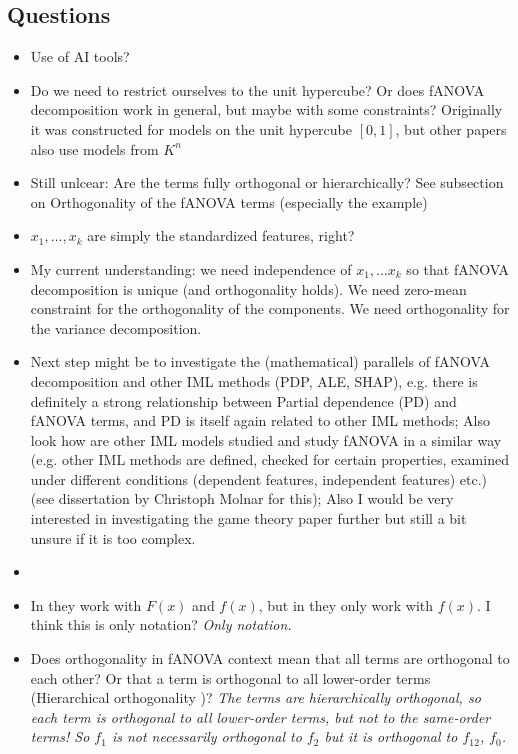 \subsection*{Questions}


\begin{itemize}
    \item Use of AI tools?
    \item Do we need to restrict ourselves to the unit hypercube? Or does fANOVA decomposition work in general, but maybe with some constraints? Originally it was constructed for models on the unit hypercube $[0,1]$, but other papers also use models from $K^n$
    \item Still unlcear: Are the terms fully orthogonal or hierarchically? See subsection on Orthogonality of the fANOVA terms (especially the example)
    \item $x_1, \dots, x_k$ are simply the standardized features, right?
    \item {\color{orange}My current understanding: we need independence of $x_1, \dots x_k$ so that fANOVA decomposition is unique (and orthogonality holds). We need zero-mean constraint for the orthogonality of the components. We need orthogonality for the variance decomposition.}
    \item Next step might be to investigate the (mathematical) parallels of fANOVA decomposition and other IML methods (PDP, ALE, SHAP), e.g. there is definitely a strong relationship between Partial dependence (PD) and fANOVA terms, and PD is itself again related to other IML methods; Also look how are other IML models studied and study fANOVA in a similar way (e.g. other IML methods are defined, checked for certain properties, examined under different conditions (dependent features, independent features) etc.) (see dissertation by Christoph Molnar for this); Also I would be very interested in investigating the game theory paper further \citep{fumagalli2025} but still a bit unsure if it is too complex.
    \item 
    \item In \cite{hooker2004} they work with $F(x)$ and $f(x)$, but in \cite{sobol2001} they only work with $f(x)$. I think this is only notation? \textit{Only notation.}
    \item Does orthogonality in fANOVA context mean that all terms are orthogonal to each other? Or that a term is orthogonal to all lower-order terms (\ldq Hierarchical orthogonality \rdq)? \textit{The terms are hierarchically orthogonal, so each term is orthogonal to all lower-order terms, but not to the same-order terms! So $f_1$ is not necessarily orthogonal to $f_2$ but it is orthogonal to $f_{12}$, $f_{0}$.} 

\end{itemize}
